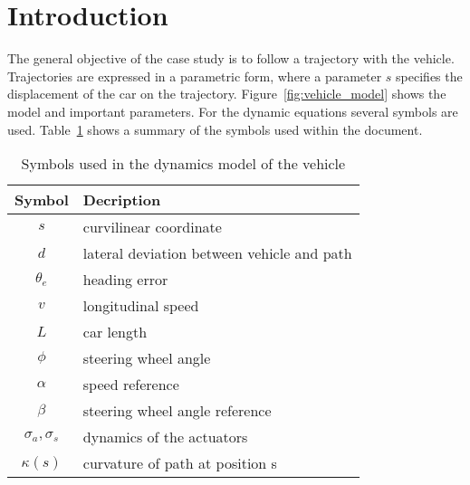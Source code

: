 \section{Introduction}
The general objective of the case study is to follow a trajectory with the vehicle.
Trajectories are expressed in a parametric form, where a parameter $s$ specifies the displacement of the car on the trajectory.
Figure~\ref{fig:vehicle_model} shows the model and important parameters.
For the dynamic equations several symbols are used. 
Table~\ref{tab:symbols} shows a summary of the symbols used within the document.
\begin{table}[h]
	\centering
	\begin{tabular}{c|l}
	\hline
	\hline
	\textbf{Symbol} & \textbf{Decription}\\
	\hline
		 $s$ & curvilinear coordinate\\
		 $d$ & lateral deviation between vehicle and path\\
		 $\theta_e$ & heading error\\
		 $v$ & longitudinal speed\\
		 $L$ & car length\\
		 $\phi$ & steering wheel angle\\
		 $\alpha$ & speed reference\\
		 $\beta$ & steering wheel angle reference\\
		 $\sigma_a, \sigma_s$ & dynamics of the actuators\\
		 $\kappa(s)$ & curvature of path at position s\\
	\hline
	\hline
	\end{tabular}
	\caption{Symbols used in the dynamics model of the vehicle}
	\label{tab:symbols}
\end{table}

